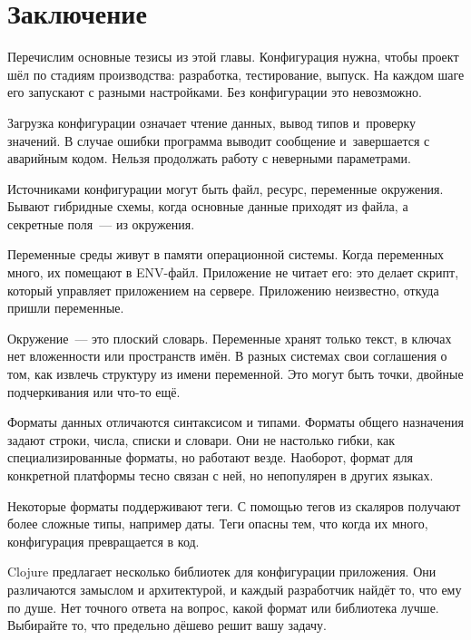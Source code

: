 \section{Заключение}

Перечислим основные тезисы из этой главы. Конфигурация нужна, чтобы проект шёл
по стадиям производства: разработка, тестирование, выпуск. На каждом шаге его
запускают с разными настройками. Без конфигурации это невозможно.

Загрузка конфигурации означает чтение данных, вывод типов и~проверку значений. В
случае ошибки программа выводит сообщение и~завершается с аварийным
кодом. Нельзя продолжать работу с неверными параметрами.

Источниками конфигурации могут быть файл, ресурс, переменные окружения. Бывают
гибридные схемы, когда основные данные приходят из файла, а секретные поля~--- из
окружения.

Переменные среды живут в памяти операционной системы. Когда переменных много, их
помещают в ENV-файл. Приложение не читает его: это делает скрипт, который
управляет приложением на сервере. Приложению неизвестно, откуда пришли
переменные.

Окружение~--- это плоский словарь. Переменные хранят только текст, в ключах нет
вложенности или пространств имён. В разных системах свои соглашения о том, как
извлечь структуру из имени переменной. Это могут быть точки, двойные
подчеркивания или что-то ещё.

Форматы данных отличаются синтаксисом и типами. Форматы общего назначения задают
строки, числа, списки и словари. Они не настолько гибки, как специализированные
форматы, но работают везде. Наоборот, формат для конкретной платформы тесно
связан с ней, но непопулярен в других языках.

Некоторые форматы поддерживают теги. С помощью тегов из скаляров получают более
сложные типы, например даты. Теги опасны тем, что когда их много, конфигурация
превращается в код.

Clojure предлагает несколько библиотек для конфигурации приложения. Они
различаются замыслом и архитектурой, и каждый разработчик найдёт то, что ему по
душе. Нет точного ответа на вопрос, какой формат или библиотека лучше. Выбирайте
то, что предельно дёшево решит вашу задачу.
